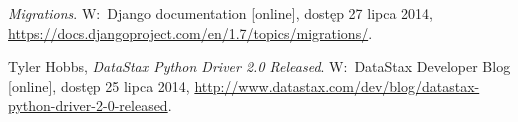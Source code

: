 \begin{thebibliography}{9}
\emph{Migrations}. W:~Django documentation [online], dostęp 27 lipca 2014, \url{https://docs.djangoproject.com/en/1.7/topics/migrations/}.

Tyler Hobbs, \emph{DataStax Python Driver 2.0 Released}. W:~DataStax Developer Blog [online], dostęp 25 lipca 2014, \url{http://www.datastax.com/dev/blog/datastax-python-driver-2-0-released}.


\end{thebibliography}
